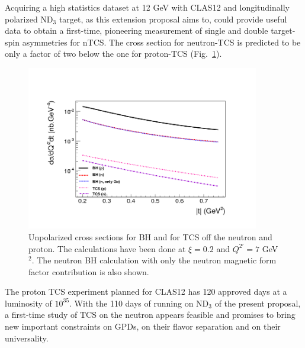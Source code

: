 \documentclass[a4paper,12pt]{report}
\begin{document}
Acquiring a high statistics dataset at 12 GeV with CLAS12 and longitudinally polarized ND$_3$ target, as this extension proposal aims to, could provide useful data to obtain a first-time, pioneering measurement of single and double target-spin asymmetries for nTCS. The cross section for neutron-TCS is predicted to be only a factor of two below the one for proton-TCS (Fig.~\ref{tcs_cs}). 
\begin{figure}[htbp] 
   \centering
   \includegraphics[width=4in]{comparcross_protonneutron_logy_0.png} 
   \caption{Unpolarized cross sections for BH and for TCS off the neutron and proton. The calculations have been done at $\xi=0.2$ and $Q^{2'}=7$ GeV$^2$. The neutron BH calculation with only the neutron magnetic form factor contribution is also shown.}
   \label{tcs_cs}
\end{figure}
The proton TCS experiment planned for CLAS12 has 120 approved days at a luminosity of $10^{35}$. With the 110 days of running on ND$_3$ of the present proposal, a first-time study of TCS on the neutron appears feasible and promises to bring new important constraints on GPDs, on their flavor separation and on their universality. 
\end{document}
